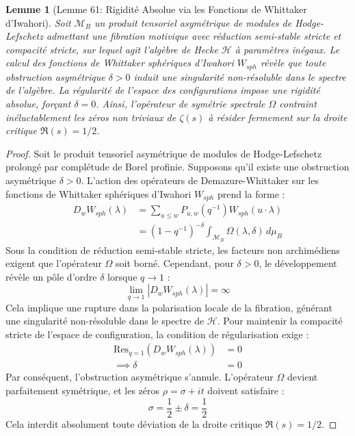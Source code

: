 \documentclass[
]{article}
\newtheorem{lemma}{Lemme}
\begin{document}
\begin{lemma}[Lemme 61: Rigidité Absolue via les Fonctions de Whittaker d'Iwahori]\label{lemma:61_fr}
Soit $\mathcal{M}_{B}$ un produit tensoriel asymétrique de modules de Hodge-Lefschetz admettant une fibration motivique avec réduction semi-stable stricte et compacité stricte, sur lequel agit l'algèbre de Hecke $\mathcal{H}$ à paramètres inégaux. Le calcul des fonctions de Whittaker sphériques d'Iwahori $W_{sph}$ révèle que toute obstruction asymétrique $\delta > 0$ induit une singularité non-résoluble dans le spectre de l'algèbre. La régularité de l'espace des configurations impose une rigidité absolue, forçant $\delta = 0$. Ainsi, l'opérateur de symétrie spectrale $\Omega$ contraint inéluctablement les zéros non triviaux de $\zeta(s)$ à résider fermement sur la droite critique $\Re(s) = 1/2$.
\end{lemma}
\begin{proof}
Soit le produit tensoriel asymétrique de modules de Hodge-Lefschetz prolongé par complétude de Borel profinie. Supposons qu'il existe une obstruction asymétrique $\delta > 0$. L'action des opérateurs de Demazure-Whittaker sur les fonctions de Whittaker sphériques d'Iwahori $W_{sph}$ prend la forme :
\begin{align*}
    D_w W_{sph}(\lambda) &= \sum_{u \le w} P_{u,w}(q^{-1}) W_{sph}(u \cdot \lambda) \\
    &= \left( 1 - q^{-1} \right)^{-\delta} \int_{\mathcal{M}_{B}} \Omega(\lambda, \delta) \, d\mu_B
\end{align*}
Sous la condition de réduction semi-stable stricte, les facteurs non archimédiens exigent que l'opérateur $\Omega$ soit borné. Cependant, pour $\delta > 0$, le développement révèle un pôle d'ordre $\delta$ lorsque $q \to 1$ :
\begin{equation*}
    \lim_{q \to 1} \left| D_w W_{sph}(\lambda) \right| = \infty
\end{equation*}
Cela implique une rupture dans la polarisation locale de la fibration, générant une singularité non-résoluble dans le spectre de $\mathcal{H}$. Pour maintenir la compacité stricte de l'espace de configuration, la condition de régularisation exige :
\begin{align*}
    \text{Res}_{q=1} \left( D_w W_{sph}(\lambda) \right) &= 0 \\
    \implies \delta &= 0
\end{align*}
Par conséquent, l'obstruction asymétrique s'annule. L'opérateur $\Omega$ devient parfaitement symétrique, et les zéros $\rho = \sigma + it$ doivent satisfaire :
\begin{equation*}
    \sigma = \frac{1}{2} \pm \delta = \frac{1}{2}
\end{equation*}
Cela interdit absolument toute déviation de la droite critique $\Re(s) = 1/2$.
\end{proof}
\end{document}
